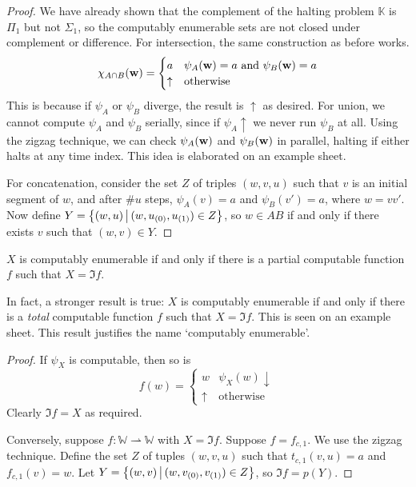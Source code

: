 \begin{proof}
	We have already shown that the complement of the halting problem \( \mathbb K \) is \( \Pi_1 \) but not \( \Sigma_1 \), so the computably enumerable sets are not closed under complement or difference.
	For intersection, the same construction as before works.
	\[ \chi_{A \cap B}(\vb w) = \begin{cases}
		a & \psi_A(\vb w) = a \text{ and } \psi_B(\vb w) = a \\
		\uparrow & \text{otherwise}
	\end{cases} \]
	This is because if \( \psi_A \) or \( \psi_B \) diverge, the result is \( \uparrow \) as desired.
	For union, we cannot compute \( \psi_A \) and \( \psi_B \) serially, since if \( \psi_A \uparrow \) we never run \( \psi_B \) at all.
	Using the zigzag technique, we can check \( \psi_A(\vb w) \) and \( \psi_B(\vb w) \) in parallel, halting if either halts at any time index.
	This idea is elaborated on an example sheet.

	For concatenation, consider the set \( Z \) of triples \( (w, v, u) \) such that \( v \) is an initial segment of \( w \), and after \( \#u \) steps, \( \psi_A(v) = a \) and \( \psi_B(v') = a \), where \( w = vv' \).
	Now define \( Y = \qty{(w, u) \,\middle|\,(w, u_{(0)}, u_{(1)}) \in Z} \), so \( w \in AB \) if and only if there exists \( v \) such that \( (w, v) \in Y \).
\end{proof}
\begin{proposition}
	\( X \) is computably enumerable if and only if there is a partial computable function \( f \) such that \( X = \Im f \).
\end{proposition}
\begin{remark}
	In fact, a stronger result is true: \( X \) is computably enumerable if and only if there is a \emph{total} computable function \( f \) such that \( X = \Im f \).
	This is seen on an example sheet.
	This result justifies the name `computably enumerable'.
\end{remark}
\begin{proof}
	If \( \psi_X \) is computable, then so is
	\[ f(w) = \begin{cases}
		w & \psi_X(w) \downarrow \\
		\uparrow & \text{otherwise}
	\end{cases} \]
	Clearly \( \Im f = X \) as required.

	Conversely, suppose \( f \colon \mathbb W \rightharpoonup \mathbb W \) with \( X = \Im f \).
	Suppose \( f = f_{c,1} \).
	We use the zigzag technique.
	Define the set \( Z \) of tuples \( (w, v, u) \) such that \( t_{c,1}(v,u) = a \) and \( f_{c,1}(v) = w \).
	Let \( Y = \qty{(w,v) \,\middle|\,(w, v_{(0)}, v_{(1)}) \in Z} \), so \( \Im f = p(Y) \).
\end{proof}

